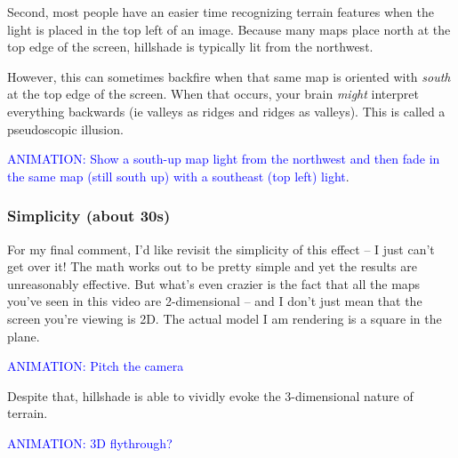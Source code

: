 \documentclass{article}
\newcommand\animation[1]{\textcolor{blue}{ANIMATION: #1}}
\begin{document}
Second, most people have an easier time recognizing terrain features when the light is placed in the top left of an image.
Because many maps place north at the top edge of the screen, hillshade is typically lit from the northwest.

However, this can sometimes backfire when that same map is oriented with \textit{south} at the top edge of the screen.
When that occurs, your brain \textit{might} interpret everything backwards (ie valleys as ridges and ridges as valleys).
This is called a pseudoscopic illusion.

\animation{Show a south-up map light from the northwest and then fade in the same map (still south up) with a southeast (top left) light}.

\subsubsection{Simplicity (about 30s)}

For my final comment, I'd like revisit the simplicity of this effect -- I just can't get over it!
The math works out to be pretty simple and yet the results are unreasonably effective.
But what's even crazier is the fact that all the maps you've seen in this video are 2-dimensional -- and I don't just mean that the screen you're viewing is 2D.
The actual model I am rendering is a square in the plane.

\animation{Pitch the camera}

Despite that, hillshade is able to vividly evoke the 3-dimensional nature of terrain.

\animation{3D flythrough?}
\end{document}
